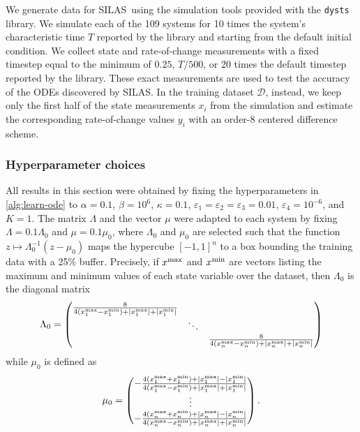 \documentclass[11pt]{amsart}
\numberwithin{equation}{section}
\theoremstyle{plain}
\theoremstyle{definition}
\theoremstyle{remark}
\renewcommand{\vec}[1]{{#1}}
\newcommand{\mat}[1]{{#1}}
\newcommand{\methodname}{{SILAS}}
\begin{document}
We generate data for \methodname\ using the simulation tools provided with the \texttt{dysts} library. We simulate each of the 109 systems for 10 times the system's characteristic time $T$ reported by the library and starting from the default initial condition. We collect state and rate-of-change measurements with a fixed timestep equal to the minimum of $0.25$, $T/500$, or 20 times the default timestep reported by the library. These exact measurements are used to test the accuracy of the ODEs discovered by \methodname. In the training dataset $\mathcal{D}$, instead, we keep only the first half of the state measurements $\vec{x}_i$ from the simulation and estimate the corresponding rate-of-change values $\vec{y}_i$ with an order-8 centered difference scheme.

\subsubsection{Hyperparameter choices}\label{ss:dysts-hyperparams}
All results in this section were obtained by fixing the hyperparameters in \cref{alg:learn-ode} to
$\alpha = 0.1$, 
$\beta = 10^6$, 
$\kappa = 0.1$,
$\varepsilon_1 = \varepsilon_2 = \varepsilon_3 = 0.01$, 
$\varepsilon_4 = 10^{-6}$, and
$K=1$.
The matrix $\mat{\Lambda}$ and the vector $\vec{\mu}$ were adapted to each system by fixing $\mat{\Lambda} = 0.1 \mat{\Lambda}_0$ and $\vec{\mu} = 0.1 \vec{\mu}_0$, where $\mat{\Lambda}_0$ and $\vec{\mu}_0$ are selected such that the function $\vec{z}\mapsto \mat{\Lambda}_0^{-1}(\vec{z} - \vec{\mu}_0)$ maps the hypercube $[-1,1]^n$ to a box bounding the training data with a 25\% buffer. Precisely, if  $\vec{x}^{\rm max}$ and $\vec{x}^{\rm min}$ are vectors listing the maximum and minimum values of each state variable over the dataset, then $\mat{\Lambda}_0$ is the diagonal matrix
\begin{equation*}
    \mat{\Lambda}_0 = \begin{pmatrix}
        \frac{8}{4 (x^{\rm max}_1 - x^{\rm min}_1) + |x^{\rm max}_1| + |x^{\rm min}_1|}
        \\
        &\ddots \\
        &&
        \frac{8}{4 (x^{\rm max}_n - x^{\rm min}_n) + |x^{\rm max}_n| + |x^{\rm min}_n|}
    \end{pmatrix}
\end{equation*}
while $\mu_0$ is defined as
\begin{equation*}
    \vec{\mu}_0 = \begin{pmatrix}
        -\frac{4 (x^{\rm max}_1 + x^{\rm min}_1) + |x^{\rm max}_1| - |x^{\rm min}_1|}{4 (x^{\rm max}_1 - x^{\rm min}_1) + |x^{\rm max}_1| + |x^{\rm min}_1|}
        \\
        \vdots\\
        -\frac{4 (x^{\rm max}_n + x^{\rm min}_n) + |x^{\rm max}_n| - |x^{\rm min}_n|}{4 (x^{\rm max}_n - x^{\rm min}_n) + |x^{\rm max}_n| + |x^{\rm min}_n|}
    \end{pmatrix}.
\end{equation*}
\end{document}
